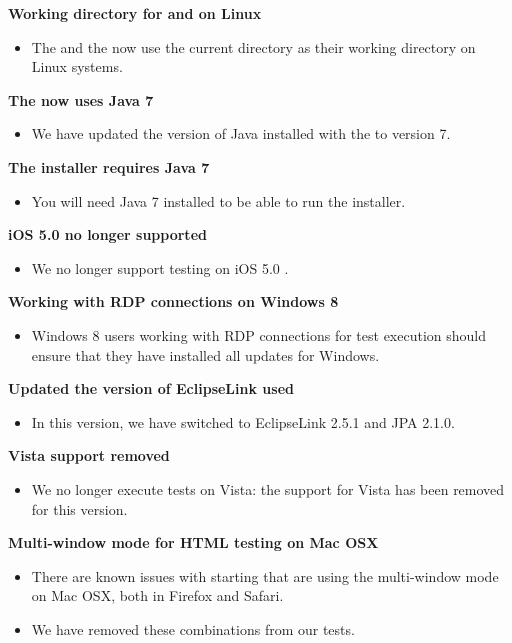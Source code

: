 \textbf{Working directory for \ite{} and \gdagent{} on Linux}
\begin{itemize}
\item The \gdagent{} and the \ite{} now  use the current directory as their working directory on Linux systems.
\end{itemize}


\textbf{The \ite{} now uses Java 7}
\begin{itemize}
\item We have updated the version of Java installed with the \ite{} to version 7.
\end{itemize}

\textbf{The installer requires Java 7}
\begin{itemize}
\item You will need Java 7 installed to be able to run the installer.
\end{itemize}

\textbf{iOS 5.0 no longer supported}
\begin{itemize}
\item We no longer support testing on iOS 5.0 \gdauts{}.
\end{itemize}

\textbf{Working with RDP connections on Windows 8}
\begin{itemize}
\item Windows 8 users working with RDP connections for test execution should ensure that they have installed all updates for Windows. 
\end{itemize}

\textbf{Updated the version of EclipseLink used}
\begin{itemize}
\item In this version, we have switched to EclipseLink 2.5.1 and JPA 2.1.0.
\end{itemize}

\textbf{Vista support removed}
\begin{itemize}
\item We no longer execute tests on Vista: the support for Vista has been removed for this version.
\end{itemize}

\textbf{Multi-window mode for HTML testing on Mac OSX}
\begin{itemize}
\item There are known issues with starting \gdauts{} that are using the multi-window mode on Mac OSX, both in Firefox and Safari.
\item We have removed these combinations from our tests.
\end{itemize}
